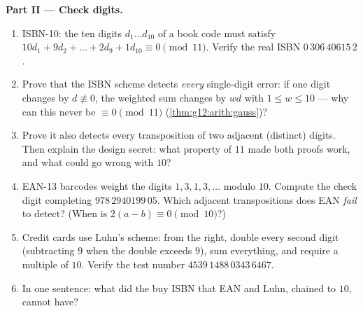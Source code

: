\begin{problem}
\medskip
\noindent\textbf{Part II --- Check digits.}
\begin{enumerate}[resume]
  \item ISBN-10: the ten digits $d_1 \dots d_{10}$ of a book
        code must satisfy
        $10d_1 + 9d_2 + \dots + 2d_9 + 1d_{10} \equiv 0
        \pmod{11}$. Verify the real ISBN
        $0\,306\,40615\,2$.
  \item Prove that the ISBN scheme detects \emph{every}
        single-digit error: if one digit changes by
        $d \not\equiv 0$, the weighted sum changes by $w d$
        with $1 \leq w \leq 10$ --- why can this never be
        $\equiv 0 \pmod{11}$
        (\cref{thm:g12:arith:gauss})?
  \item Prove it also detects every transposition of two
        adjacent (distinct) digits. Then explain the design
        secret: what property of $11$ made both proofs work,
        and what could go wrong with  $10$?
  \item EAN-13 barcodes weight the digits $1, 3, 1, 3, \dots$
        modulo $10$. Compute the check digit completing
        $978\,2940199\,05$. Which adjacent transpositions does
        EAN \emph{fail} to detect? (When is
        $2(a - b) \equiv 0 \pmod{10}$?)
  \item Credit cards use Luhn's scheme: from the right, double
        every second digit (subtracting $9$ when the double
        exceeds $9$), sum everything, and require a multiple of
        $10$. Verify the test number
        $4539\,1488\,0343\,6467$.
  \item In one sentence: what did the   buy ISBN
        that EAN and Luhn, chained to $10$, cannot have?
\end{enumerate}


\end{problem}

